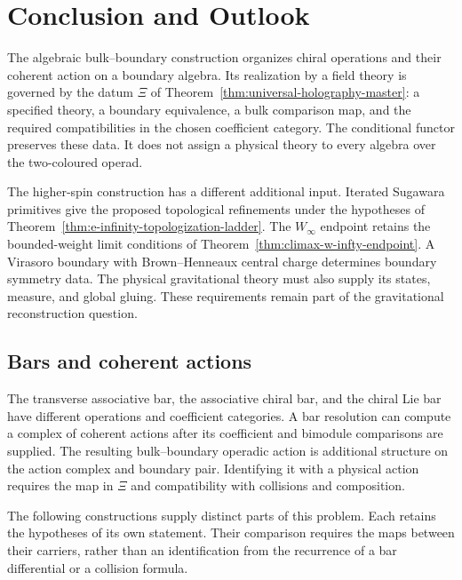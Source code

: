 \section{Conclusion and Outlook}
\label{sec:conclusion}%
\label{sec:concordance}%

The algebraic bulk--boundary construction organizes chiral operations
and their coherent action on a boundary algebra. Its realization by a
field theory is governed by the datum $\Xi$ of
Theorem~\ref{thm:universal-holography-master}: a specified theory,
a boundary equivalence, a bulk comparison map, and the required
compatibilities in the chosen coefficient category. The conditional
functor preserves these data. It does not assign a physical theory to
every algebra over the two-coloured operad.

The higher-spin construction has a different additional input.
Iterated Sugawara primitives give the proposed topological refinements
under the hypotheses of Theorem~\ref{thm:e-infinity-topologization-ladder}.
The $W_\infty$ endpoint retains the bounded-weight limit conditions of
Theorem~\ref{thm:climax-w-infty-endpoint}. A Virasoro boundary with
Brown--Henneaux central charge determines boundary symmetry data.
The physical gravitational theory must also supply its states, measure,
and global gluing. These requirements remain part of the gravitational
reconstruction question.

\subsection{Bars and coherent actions}

The transverse associative bar, the associative chiral bar, and the
chiral Lie bar have different operations and coefficient categories.
A bar resolution can compute a complex of coherent actions after its
coefficient and bimodule comparisons are supplied. The resulting
bulk--boundary operadic action is additional structure on the action
complex and boundary pair. Identifying it with a physical action requires
the map in $\Xi$ and compatibility with collisions and composition.

The following constructions supply distinct parts of this problem.
Each retains the hypotheses of its own statement. Their comparison
requires the maps between their carriers, rather than an identification
from the recurrence of a bar differential or a collision formula.


